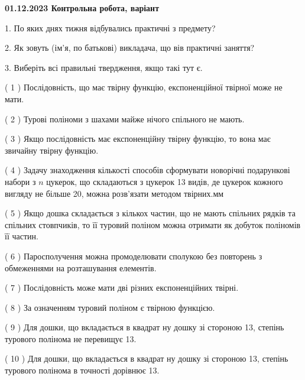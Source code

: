 \documentclass[12pt, ukrainian]{article}
\begin{document}
\vspace{4mm}
\newpage
\begin {large}

\textbf{01.12.2023 Контрольна робота, варіант  }\par


{
1. По яких днях тижня відбувались практичні з предмету?



\vspace{5mm}
2. Як зовуть (ім'я, по батькові) викладача, що вів практичні заняття?



\vspace{5mm}
3. Виберіть всі правильні твердження, якщо такі тут є.\par
\vspace{2mm}
( 1 ) Послідовність, що має твірну функцію, експоненційної твірної може не мати.%

( 2 ) Турові поліноми з шахами майже нічого спільного не мають.%

( 3 ) Якщо послідовність має експоненційну твірну функцію, то вона має звичайну твірну функцію.%

( 4 ) Задачу знаходження кількості способів сформувати новорічні подарункові набори з $n$ цукерок, що складаються з цукерок 13 видів, де цукерок кожного вигляду не більше 20, можна розв’язати методом твірних.мм%

( 5 ) Якщо дошка складається з кількох частин, що не мають спільних рядків та спільних стовпчиків, то її туровий поліном можна отримати як добуток поліномів її частин.%

( 6 ) Паросполучення можна промоделювати сполукою без повторень з обмеженнями на розташування елементів.%

( 7 ) Послідовність може мати дві різних експоненційних твірні.%

( 8 ) За означенням туровий поліном є твірною функцією.%

( 9 ) Для дошки, що вкладається в квадрат ну дошку зі стороною 13, степінь турового полінома не перевищує 13.%

( 10 ) Для дошки, що вкладається в квадрат ну дошку зі стороною 13, степінь турового полінома в точності дорівнює 13.%
}
\end {large}
\end{document}
